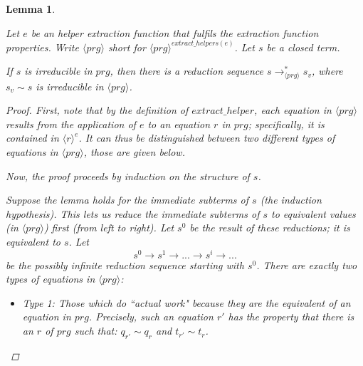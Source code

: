 \documentclass[11pt]{article} %
\newtheorem{lemma}{Lemma}
\begin{document}
\begin{lemma}
\label{lemma3}

Let $e$ be an helper extraction function that fulfils the extraction function properties. Write $\langle prg \rangle$ short for $\langle prg \rangle^{extract\_helpers(e)}$. Let $s$ be a closed term.

If $s$ is irreducible in $prg$, then there is a reduction sequence $s \longrightarrow^*_{\langle prg \rangle} s_v$, where $s_v \sim s$ is irreducible in $\langle prg \rangle$.

\begin{proof}

First, note that by the definition of $extract\_helper$, each equation in $\langle prg \rangle$ results from the application of $e$ to an equation $r$ in $prg$; specifically, it is contained in $\langle r \rangle^e$. It can thus be distinguished between two different types of equations in $\langle prg \rangle$, those are given below.

Now, the proof proceeds by induction on the structure of $s$.

Suppose the lemma holds for the immediate subterms of $s$ (the induction hypothesis). This lets us reduce the immediate subterms of $s$ to equivalent values (in $\langle prg \rangle$) first (from left to right). Let $s^0$ be the result of these reductions; it is equivalent to $s$. Let
\begin{equation*}
s^0 \longrightarrow s^1 \longrightarrow ... \longrightarrow s^i \longrightarrow ...
\end{equation*}
be the possibly infinite reduction sequence starting with $s^0$. There are exactly two types of equations in $\langle prg \rangle$:
\begin{itemize}
\item Type 1: Those which do ``actual work" because they are the equivalent of an equation in $prg$. Precisely, such an equation $r'$ has the property that there is an $r$ of $prg$ such that: $q_{r'} \sim q_r$ and $t_{r'} \sim t_r$.


\end{itemize}
\end{proof}
\end{lemma}
\end{document}
